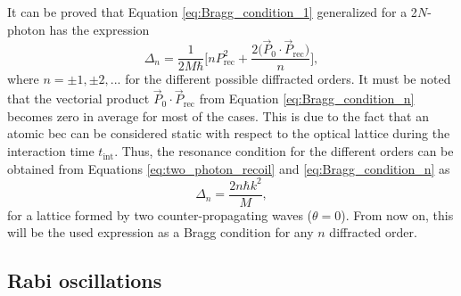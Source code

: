 It can be proved that Equation \eqref{eq:Bragg_condition_1} generalized for a 2$N$-photon has the expression \cite{Kozuma1999}
\begin{equation}\label{eq:Bragg_condition_n}
	\Delta_n = \frac{1}{2M\hbar} \Bigg[n P_{\text{rec}}^2 + \frac{2\big(\vec{P}_0 \cdot \vec{P}_{\text{rec}}\big)}{n}\Bigg],
\end{equation}
where $n=\pm1, \pm2, \text{...}$ for the different possible diffracted orders. It must be noted that the vectorial product $\vec{P}_0 \cdot \vec{P}_{\text{rec}}$ from Equation \eqref{eq:Bragg_condition_n} becomes zero in average for most of the cases. This is due to the fact that an atomic \ac{bec} can be considered static with respect to the optical lattice during the interaction time $t_{\text{int}}$. Thus, the resonance condition for the different orders can be obtained from Equations \eqref{eq:two_photon_recoil} and \eqref{eq:Bragg_condition_n} as
\begin{equation}\label{eq:Bragg_condition}
	\Delta_n = \frac{2n\hbar k^2}{M},
\end{equation}
for a lattice formed by two counter-propagating waves ($\theta = 0$). From now on, this will be the used expression as a Bragg condition for any $n$ diffracted order. 

\subsection{Rabi oscillations}\label{subsec:Rabi_oscillations}

